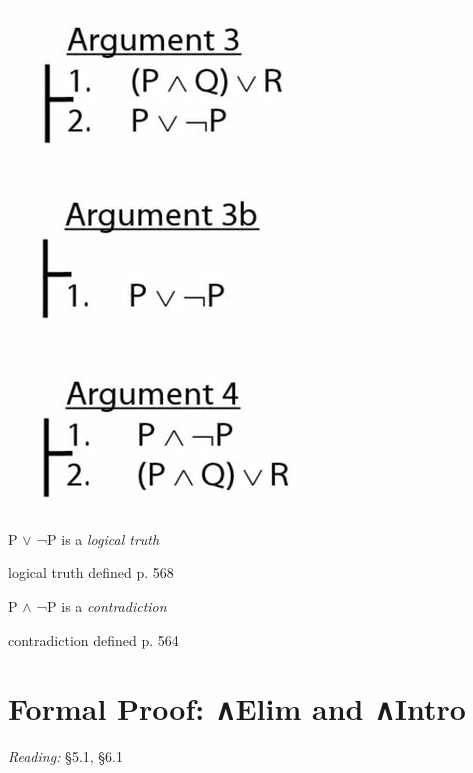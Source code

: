 \documentclass[12pt]{extarticle}
\begin{document}
\begin{multicols*}{3}
\begin{center}
\includegraphics[scale=0.3]{img/unit_160_argument3.png}
\end{center}
\begin{center}
\includegraphics[scale=0.3]{img/unit_160_argument3b.png}
\end{center}
\begin{center}
\includegraphics[scale=0.3]{img/unit_160_argument4.png}
\end{center}
P $\lor{}$ ¬P is a \emph{logical truth}
 
logical truth defined p. 568
 
P $\land{}$ ¬P is a \emph{contradiction}
 
contradiction defined p. 564
 
 
 
\section{Formal Proof: ∧Elim and ∧Intro}
 
\emph{Reading:} §5.1, §6.1
 

\end{multicols*}
\end{document}

